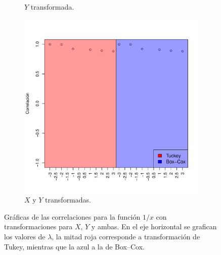 \documentclass[paper=leter, fontsize=11pt]{scrartcl}
\numberwithin{equation}{section}		%
\numberwithin{figure}{section}			%
\numberwithin{table}{section}				%
\begin{document}
\begin{figure}
\begin{subfigure}{0.5\textwidth}
        \caption{$Y$ transformada.}
        \label{yTcorr3}
    \end{subfigure}
    \begin{subfigure}{1\textwidth}
        \centering
        \includegraphics[scale=0.4]{xT_yTcorr3.pdf}
        \caption{$X$ y $Y$ transformadas.}
        \label{yTcorr3}
    \end{subfigure}
    \caption{Gráficas de las correlaciones para la función $1/x$ con transformaciones para $X$, $Y$ y ambas. En el eje horizontal se grafican los valores de $\lambda$, la mitad roja corresponde a transformación de Tukey, mientras que la azul a la de Box--Cox.}
    \label{corr3}
\end{figure}



\end{document}
